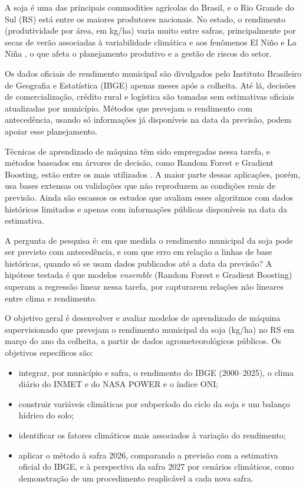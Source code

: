 \documentclass[
	article,			%
	11pt,				%
	oneside,			%
	a4paper,			%
	english,			%
	brazil,				%
	sumario=tradicional
	]{abntex2}
\begin{document}
A soja é uma das principais commodities agrícolas do Brasil, e o Rio Grande do Sul (RS) está entre os maiores produtores nacionais. No estado, o rendimento (produtividade por área, em kg/ha) varia muito entre safras, principalmente por secas de verão associadas à variabilidade climática e aos fenômenos El Niño e La Niña \cite{pilau2022,noia2020}, o que afeta o planejamento produtivo e a gestão de riscos do setor.

Os dados oficiais de rendimento municipal são divulgados pelo Instituto Brasileiro de Geografia e Estatística (IBGE) apenas meses após a colheita. Até lá, decisões de comercialização, crédito rural e logística são tomadas sem estimativas oficiais atualizadas por município. Métodos que prevejam o rendimento com antecedência, usando só informações já disponíveis na data da previsão, podem apoiar esse planejamento.

Técnicas de aprendizado de máquina têm sido empregadas nessa tarefa, e métodos baseados em árvores de decisão, como Random Forest e Gradient Boosting, estão entre os mais utilizados \cite{vanklompenburg2020,jeong2016,vonbloh2023}. A maior parte dessas aplicações, porém, usa bases extensas ou validações que não reproduzem as condições reais de previsão. Ainda são escassos os estudos que avaliam esses algoritmos com dados históricos limitados e apenas com informações públicas disponíveis na data da estimativa.

A pergunta de pesquisa é: em que medida o rendimento municipal da soja pode ser previsto com antecedência, e com que erro em relação a linhas de base históricas, quando só se usam dados publicados até a data da previsão? A hipótese testada é que modelos \emph{ensemble} (Random Forest e Gradient Boosting) superam a regressão linear nessa tarefa, por capturarem relações não lineares entre clima e rendimento.

O objetivo geral é desenvolver e avaliar modelos de aprendizado de máquina supervisionado que prevejam o rendimento municipal da soja (kg/ha) no RS em março do ano da colheita, a partir de dados agrometeorológicos públicos. Os objetivos específicos são:

\begin{itemize}
\item integrar, por município e safra, o rendimento do IBGE (2000--2025), o clima diário do INMET e do NASA POWER e o índice ONI;
\item construir variáveis climáticas por subperíodo do ciclo da soja e um balanço hídrico do solo;
\item identificar os fatores climáticos mais associados à variação do rendimento;
\item aplicar o método à safra 2026, comparando a previsão com a estimativa oficial do IBGE, e à perspectiva da safra 2027 por cenários climáticos, como demonstração de um procedimento reaplicável a cada nova safra.
\end{itemize}
\end{document}
